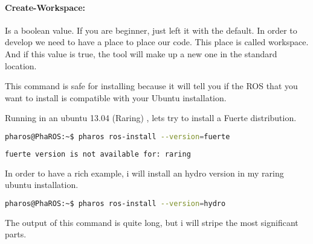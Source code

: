 \documentclass[a4paper,10pt,twoside]{book}
\begin{document}
				\paragraph{Create-Workspace:} Is a boolean value.  If you are beginner, just left it with the default. In order to develop we need to have a place to place our code. This place is called workspace. And if this value is true, the tool will make up a new one in the standard location.
				
				
				
				
				This command is safe for installing because it will tell you if the ROS that you want to install is compatible with your Ubuntu installation.
				
				Running in an ubuntu 13.04 (Raring) , lets try to install a Fuerte distribution.
				
				\begin{lstlisting}[language=bash,title={\installationTool{} Installing incompatible version}]
						pharos@PhaROS:~$ pharos ros-install --version=fuerte
				\end{lstlisting}
				
				\begin{lstlisting}[language=bash,title={\installationTool{} Installing incompatible version - Output}]
						fuerte version is not available for: raring
				\end{lstlisting}
				
				
				In order to have a rich example, i will install an hydro version in my raring ubuntu installation. 
				
				
				\begin{lstlisting}[language=bash,title={\installationTool{} Installing Hydro in Ubuntu: Raring}]
						pharos@PhaROS:~$ pharos ros-install --version=hydro
				\end{lstlisting}
				
				The output of this command is quite long, but i will stripe the most significant parts. 
				
\end{document}
